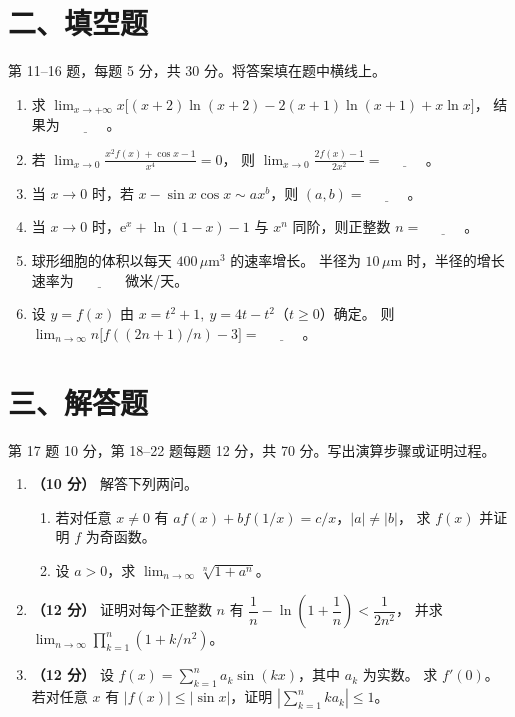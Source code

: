 \documentclass[UTF8,a4paper,zihao=-4,fontset=fandol]{ctexart}
\newcommand{\blank}{\underline{\hspace{3em}}}
\newcommand{\fillsection}{%
  \section*{二、填空题}
  第 11--16 题，每题 5 分，共 30 分。将答案填在题中横线上。}
\newcommand{\solvesection}{%
  \newpage
  \section*{三、解答题}
  第 17 题 10 分，第 18--22 题每题 12 分，共 70 分。写出演算步骤或证明过程。}
\begin{document}
\fillsection
\begin{enumerate}[start=11]
\item 求 $\displaystyle\lim_{x\to+\infty}x\big[(x+2)\ln(x+2)-2(x+1)\ln(x+1)+x\ln x\big]$，
结果为 $\blank$。
\item 若 $\displaystyle\lim_{x\to0}\frac{x^2 f(x)+\cos x-1}{x^4}=0$，
则 $\displaystyle\lim_{x\to0}\frac{2f(x)-1}{2x^2}=\blank$。
\item 当 $x\to0$ 时，若 $x-\sin x\cos x\sim ax^b$，则 $(a,b)=\blank$。
\item 当 $x\to0$ 时，$\mathrm{e}^x+\ln(1-x)-1$ 与 $x^n$ 同阶，则正整数 $n=\blank$。
\item 球形细胞的体积以每天 $400\,\mu\mathrm{m}^3$ 的速率增长。
半径为 $10\,\mu\mathrm{m}$ 时，半径的增长速率为 $\blank$ 微米/天。
\item 设 $y=f(x)$ 由 $x=t^2+1,\ y=4t-t^2$（$t\ge0$）确定。
则 $\displaystyle\lim_{n\to\infty}n\big[f((2n+1)/n)-3\big]=\blank$。
\end{enumerate}
\solvesection
\begin{enumerate}[start=17]
\item \textbf{（10 分）} 解答下列两问。
\begin{enumerate}[label=(\arabic*),nosep]
\item 若对任意 $x\ne0$ 有 $af(x)+bf(1/x)=c/x$，$|a|\ne|b|$，
求 $f(x)$ 并证明 $f$ 为奇函数。
\item 设 $a>0$，求 $\displaystyle\lim_{n\to\infty}\sqrt[n]{1+a^n}$。
\end{enumerate}
\vspace{4.5cm}
\item \textbf{（12 分）} 证明对每个正整数 $n$ 有
$\dfrac1n-\ln(1+\dfrac1n)<\dfrac1{2n^2}$，
并求 $\displaystyle\lim_{n\to\infty}\prod_{k=1}^n(1+k/n^2)$。
\vspace{4.5cm}
\item \textbf{（12 分）} 设 $f(x)=\sum_{k=1}^{n}a_k\sin(kx)$，其中 $a_k$ 为实数。
求 $f'(0)$。若对任意 $x$ 有 $|f(x)|\le|\sin x|$，证明 $|\sum_{k=1}^{n}ka_k|\le1$。
\end{enumerate}
\newpage
\end{document}
